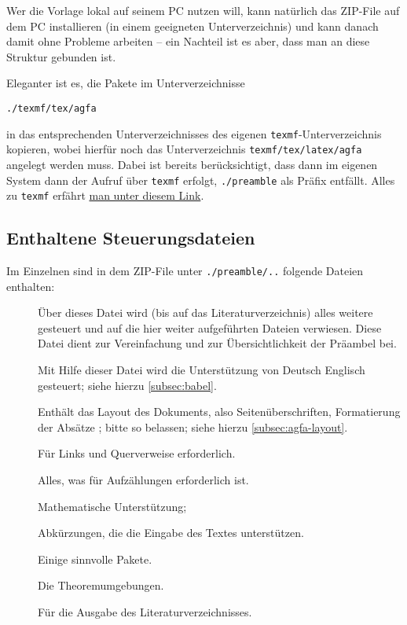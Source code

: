 Wer die Vorlage lokal auf seinem PC nutzen will, kann natürlich das ZIP-File auf dem PC installieren (in einem geeigneten Unterverzeichnis) und kann danach damit ohne Probleme arbeiten -- ein Nachteil ist es aber, dass man an diese Struktur gebunden ist.

Eleganter ist es, die Pakete im Unterverzeichnisse 
\begin{center}
\texttt{./texmf/tex/agfa}
\end{center}
in das entsprechenden Unterverzeichnisses des eigenen \texttt{texmf}-Unterverzeichnis kopieren, wobei hierfür noch das Unterverzeichnis \texttt{texmf/tex/latex/agfa} angelegt werden muss.
Dabei ist bereits berücksichtigt, dass dann im eigenen System dann der Aufruf über \texttt{texmf} erfolgt, \dh \texttt{./preamble} als Präfix entfällt.
Alles zu \texttt{texmf} erfährt \href{https://tex.stackexchange.com/questions/420620/what-is-texmf-and-what-is-its-relation-to-tex}{man unter diesem Link}.
\subsection{Enthaltene Steuerungsdateien}\label{subsec:dateieninzipfile}
%
Im Einzelnen sind in dem ZIP-File unter \texttt{./preamble/..} folgende Dateien enthalten:

\begin{description}
\item[]
Über dieses Datei wird (bis auf das Literaturverzeichnis) alles weitere gesteuert und auf die hier weiter aufgeführten Dateien verwiesen.
Diese Datei dient zur Vereinfachung und zur Übersichtlichkeit der Präambel bei.

\item[]
Mit Hilfe dieser Datei wird die Unterstützung von Deutsch \bzw Englisch gesteuert; siehe hierzu \vref{subsec:babel}.

\item[]
Enthält das Layout des Dokuments, also Seitenüberschriften, Formatierung der Absätze \etc; bitte so belassen; siehe hierzu \vref{subsec:agfa-layout}.

\item[]
Für Links und Querverweise erforderlich.

\item[]
Alles, was für Aufzählungen erforderlich ist.

\item[]
Mathematische Unterstützung; 


\item[]
Abkürzungen,  die die Eingabe des Textes unterstützen.

\item[]
Einige sinnvolle Pakete.

\item[]
Die Theoremumgebungen.

\item[]
Für die Ausgabe des Literaturverzeichnisses.

\end{description} 
%

